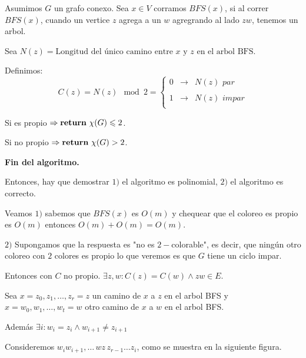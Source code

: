 \documentclass[12pt,a4paper]{article}
\begin{document}
Asumimos $G$ un grafo conexo. Sea $x \in V$ corramos $BFS(x)$, si al correr 
$BFS(x)$, cuando un vertice $z$ agrega a un $w$ agregrando al lado $zw$, tenemos 
un arbol. 
\medskip

Sea $N(z) = \text{Longitud del único camino entre $x$ y $z$ en el arbol BFS}$.
\medskip

Definimos:
$$C(z)=  N(z) \mod 2 =\left\{ \begin{array}{lcc}
    0   & \to & N(z)\,\, par \\
    \\1 & \to & N(z)\,\, impar\\
    \end{array}
    \right.$$

Si es propio $\Rightarrow \text{\textbf{return}}\,\, \chi(G) \leqslant 2$.
\medskip

Si no propio $\Rightarrow \text{\textbf{return}}\,\, \chi(G) > 2$.
\medskip

\textbf{Fin del algoritmo.}
\medskip

Entonces, hay que demostrar $1)$ el algoritmo es polinomial, $2)$ el algoritmo
es correcto.
\medskip

Veamos $1)$ sabemos que $BFS(x)$ es $O(m)$ y chequear que el coloreo es propio 
es $O(m)$ entonces $O(m) + O(m) = O(m)$.
\medskip

$2)$ Supongamos que la respuesta es "no es $2-$colorable", es decir, que ningún 
otro coloreo con $2$ colores es propio lo que veremos es que $G$ tiene un ciclo 
impar.
\medskip

Entonces con $C$ no propio. $\exists z,w : C(z) = C(w) \wedge zw \in E$.
\medskip

Sea $x = z_{0}, z_{1}, \ldots , z_{r} = z$ un camino de $x$ a $z$ en el arbol BFS
y $x = w_{0}, w_{1}, \ldots , w_{t} = w$ otro camino de $x$ a $w$ en el arbol BFS.
\medskip

Además $\exists i : w_{i} = z_{i} \wedge w_{i+1} \neq z_{i+1}$
\medskip

Consideremos $w_{i}w_{i+1}, \ldots\, wz\, z_{r-1} \ldots z_{i}$, como se 
muestra en la siguiente figura.
\end{document}
